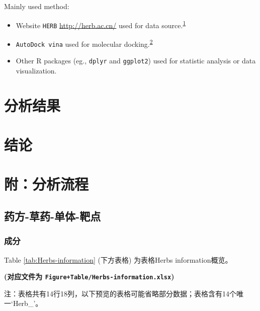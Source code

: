\documentclass[
]{article}
\providecommand{\tightlist}{%
  \setlength{\itemsep}{0pt}\setlength{\parskip}{0pt}}
\begin{document}
Mainly used method:

\begin{itemize}
\tightlist
\item
  Website \texttt{HERB} \url{http://herb.ac.cn/} used for data source.\textsuperscript{\protect\hyperlink{ref-HerbAHighThFang2021}{1}}
\item
  \texttt{AutoDock\ vina} used for molecular docking.\textsuperscript{\protect\hyperlink{ref-AutodockVina1Eberha2021}{2}}
\item
  Other R packages (eg., \texttt{dplyr} and \texttt{ggplot2}) used for statistic analysis or data visualization.
\end{itemize}

\hypertarget{results}{%
\section{分析结果}\label{results}}

\hypertarget{dis}{%
\section{结论}\label{dis}}

\hypertarget{workflow}{%
\section{附：分析流程}\label{workflow}}

\hypertarget{ux836fux65b9-ux8349ux836f-ux5355ux4f53-ux9776ux70b9}{%
\subsection{药方-草药-单体-靶点}\label{ux836fux65b9-ux8349ux836f-ux5355ux4f53-ux9776ux70b9}}

\hypertarget{ux6210ux5206}{%
\subsubsection{成分}\label{ux6210ux5206}}

Table \ref{tab:Herbs-information} (下方表格) 为表格Herbs information概览。

\textbf{(对应文件为 \texttt{Figure+Table/Herbs-information.xlsx})}

\begin{center}\begin{tcolorbox}[colback=gray!10, colframe=gray!50, width=0.9\linewidth, arc=1mm, boxrule=0.5pt]注：表格共有14行18列，以下预览的表格可能省略部分数据；表格含有14个唯一`Herb\_'。
\end{tcolorbox}
\end{center}
\end{document}
